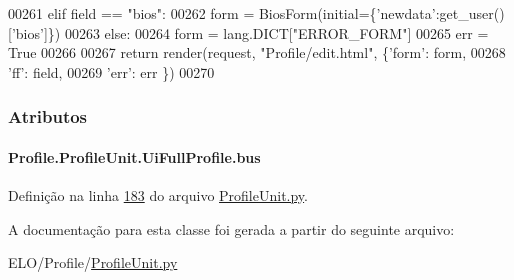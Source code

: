 \begin{DoxyCode}
00261                 \textcolor{keywordflow}{elif} field == \textcolor{stringliteral}{"bios"}:
00262                     form = BiosForm(initial=\{\textcolor{stringliteral}{'newdata'}:get\_user()[\textcolor{stringliteral}{'bios'}]\})
00263                 \textcolor{keywordflow}{else}:
00264                     form = lang.DICT[\textcolor{stringliteral}{"ERROR\_FORM"}]
00265                     err = \textcolor{keyword}{True} 
00266 
00267                 \textcolor{keywordflow}{return} render(request, \textcolor{stringliteral}{"Profile/edit.html"}, \{\textcolor{stringliteral}{'form'}: form,
00268                                                              \textcolor{stringliteral}{'ff'}: field,
00269                                                              \textcolor{stringliteral}{'err'}: err \})
00270         

\end{DoxyCode}


\subsubsection{Atributos}
\hypertarget{classProfile_1_1ProfileUnit_1_1UiFullProfile_a47049f3f61c7fada93dd84fccd19a2bd}{
\paragraph[{bus}]{\setlength{\rightskip}{0pt plus 5cm}Profile.\-Profile\-Unit.\-Ui\-Full\-Profile.\-bus}}\label{classProfile_1_1ProfileUnit_1_1UiFullProfile_a47049f3f61c7fada93dd84fccd19a2bd}


Definição na linha \hyperlink{ProfileUnit_8py_source_l00183}{183} do arquivo \hyperlink{ProfileUnit_8py_source}{Profile\-Unit.\-py}.



A documentação para esta classe foi gerada a partir do seguinte arquivo\-:\begin{DoxyCompactItemize}
\item 
E\-L\-O/\-Profile/\hyperlink{ProfileUnit_8py}{Profile\-Unit.\-py}\end{DoxyCompactItemize}
